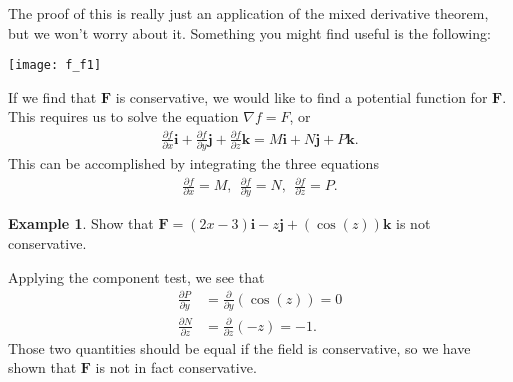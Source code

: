 \documentclass[12pt, letter]{article}
\theoremstyle{plain}
\numberwithin{theorem}{section}
\theoremstyle{definition}
\newtheorem{example}[theorem]{Example}
\begin{document}
\bigskip

The proof of this is really just an application of the mixed derivative theorem, but we won't worry about it. Something you might find useful is the following:

\bigskip

\begin{center}
\texttt{[image: f\_f1]}
\end{center}

\bigskip

\hrulefill

\bigskip

If we find that $\bm{F}$ is conservative, we would like to find a potential function for $\bm{F}$. This requires us to solve the equation $\nabla f=F$, or
\begin{align*}
\frac{\partial f}{\partial x} \bm{i}+\frac{\partial f}{\partial y} \bm{j}+\frac{\partial f}{\partial z} \bm{k} = M\bm{i}+N\bm{j}+P\bm{k}.
\end{align*}
This can be accomplished by integrating the three equations
\begin{align*}
\frac{\partial f}{\partial x} =M, \ \ \frac{\partial f}{\partial y} = N, \ \ \frac{\partial f}{\partial z} = P.
\end{align*}

\bigskip

\hrulefill

\bigskip

\begin{example}
Show that $\bm{F} = (2x-3)\bm{i}-z\bm{j}+(\cos(z))\bm{k}$ is not conservative.

\bigskip

Applying the component test, we see that
\begin{align*}
\frac{\partial P}{\partial y} &= \frac{\partial}{\partial y}(\cos(z))=0\\
\frac{\partial N}{\partial z} &= \frac{\partial}{\partial z}(-z)=-1.
\end{align*}
Those two quantities should be equal if the field is conservative, so we have shown that $\bm{F}$ is not in fact conservative.
\end{example}

\bigskip

\hrulefill

\bigskip
\end{document}
